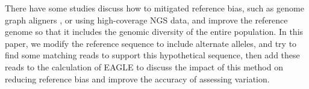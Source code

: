 There have some studies discuss how to mitigated reference bias, such as genome graph aligners \cite{garrison2018variation} \cite{li2020design}, or using high-coverage NGS data, and 
improve the reference genome so that it includes the genomic diversity of the entire population.
In this paper, we modify the reference sequence to include alternate alleles, and try to find some matching reads to support this hypothetical sequence, then add these reads to the calculation of EAGLE to discuss the impact of this method on reducing reference bias and improve the accuracy of assessing variation.

